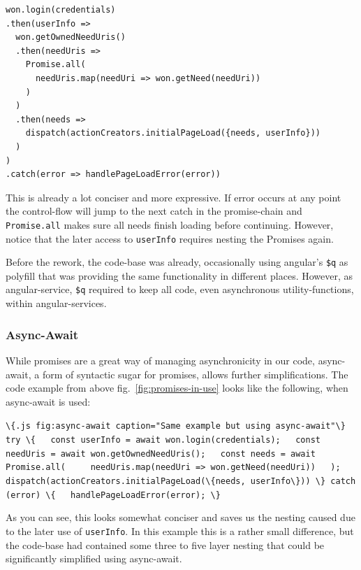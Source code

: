 \documentclass[a4paper,,tablecaptionabove]{scrbook}
\newcommand{\passthrough}[1]{#1}
\begin{document}
\begin{lstlisting}[caption={Same example but using promises}, label=fig:promise-in-use]
won.login(credentials)
.then(userInfo =>
  won.getOwnedNeedUris()
  .then(needUris =>
    Promise.all(
      needUris.map(needUri => won.getNeed(needUri))
    )
  )
  .then(needs =>
    dispatch(actionCreators.initialPageLoad({needs, userInfo}))
  )
)
.catch(error => handlePageLoadError(error))
\end{lstlisting}

This is already a lot conciser and more expressive. If error occurs at
any point the control-flow will jump to the next catch in the
promise-chain and \passthrough{\lstinline!Promise.all!} makes sure all
needs finish loading before continuing. However, notice that the later
access to \passthrough{\lstinline!userInfo!} requires nesting the
Promises again.

Before the rework, the code-base was already, occasionally using
angular's \passthrough{\lstinline!$q!} as polyfill that was providing
the same functionality in different places. However, as angular-service,
\passthrough{\lstinline!$q!} required to keep all code, even
asynchronous utility-functions, within angular-services.

\hypertarget{async-await}{%
\subsubsection{Async-Await}\label{async-await}}

While promises are a great way of managing asynchronicity in our code,
async-await, a form of syntactic sugar for promises, allows further
simplifications. The code example from above
fig.~\ref{fig:promises-in-use} looks like the following, when
async-await is used:

\passthrough{\lstinline!\{.js fig:async-await caption="Same example but using async-await"\} try \{   const userInfo = await won.login(credentials);   const needUris = await won.getOwnedNeedUris();   const needs = await Promise.all(     needUris.map(needUri => won.getNeed(needUri))   );   dispatch(actionCreators.initialPageLoad(\{needs, userInfo\})) \} catch (error) \{   handlePageLoadError(error); \}!}

As you can see, this looks somewhat conciser and saves us the nesting
caused due to the later use of \passthrough{\lstinline!userInfo!}. In
this example this is a rather small difference, but the code-base had
contained some three to five layer nesting that could be significantly
simplified using async-await.
\end{document}
